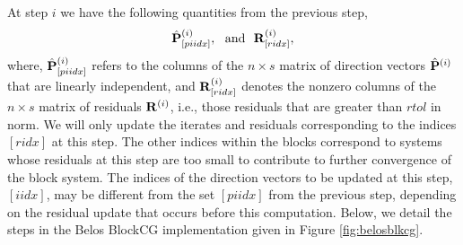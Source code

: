 \documentclass{article}
\newcommand{\bP}{{\bf P}}
\newcommand{\bR}{{\bf R}}
\newcommand{\dm}{\begin{displaymath}}
\newcommand{\edm}{\end{displaymath}}
\begin{document}
At step $i$ we have the following quantities from the previous
step,
 \dm
 {\hat \bP}^{(i)}_{[piidx]}, ~~ {\rm and} ~~ \bR^{(i)}_{[ridx]},
 \edm
where, ${\hat \bP}^{(i)}_{[piidx]}$ refers to the columns of the
$n \times s$ matrix of direction vectors ${\hat \bP}^{(i)}$ that
are linearly independent, and $\bR^{(i)}_{[ridx]}$ denotes the
nonzero columns of the $n \times s$ matrix of residuals
$\bR^{(i)}$, i.e., those residuals that are greater than $rtol$ in
norm. We will only update the iterates and residuals corresponding
to the indices $[ridx]$ at this step. The other indices within the
blocks correspond to systems whose residuals at this step are too
small to contribute to further convergence of the block system.
The indices of the direction vectors to be updated at this step,
$[iidx]$, may be different from the set $[piidx]$ from the
previous step, depending on the residual update that occurs before
this computation. Below, we detail the steps in the Belos BlockCG
implementation given in Figure \ref{fig:belosblkcg}.
\end{document}
